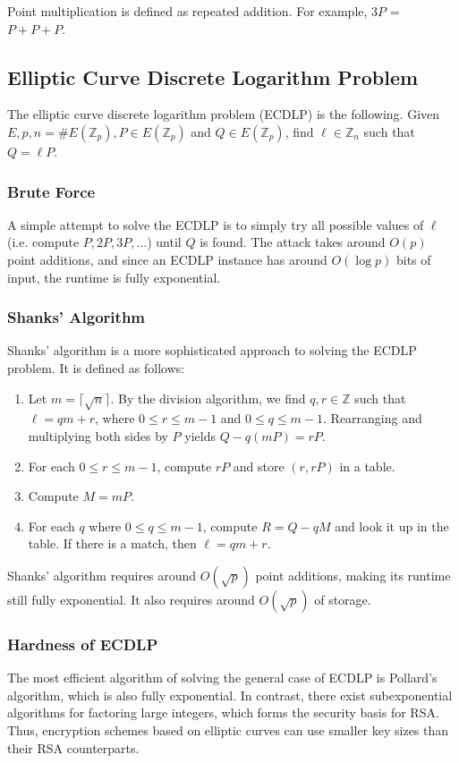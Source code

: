 \documentclass[12pt,titlepage]{article}
\begin{document}
        Point multiplication is defined as repeated addition. For example, $3 P$ = $P + P + P$.

    \subsection{Elliptic Curve Discrete Logarithm Problem}
      The elliptic curve discrete logarithm problem (ECDLP) is the following. Given $E, p, n = \#E(\mathbb{Z}_p), P \in E(\mathbb{Z}_p)$
      and $Q \in E(\mathbb{Z}_p)$, find $\ell \in \mathbb{Z}_n$ such that $Q = \ell P$.

      \subsubsection{Brute Force}
        A simple attempt to solve the ECDLP is to simply try all possible values of $\ell$ (i.e. compute $P, 2P, 3P, \dots$) until $Q$ is
        found. The attack takes around $O(p)$ point additions, and since an ECDLP instance has around $O(\log{p})$ bits of input, the runtime
        is fully exponential.

      \subsubsection{Shanks' Algorithm}
        Shanks' algorithm is a more sophisticated approach to solving the ECDLP problem. It is defined as follows:
        \begin{enumerate}
          \item Let $m = \lceil \sqrt{n} \rceil$. By the division algorithm, we find $q, r \in \mathbb{Z}$ such that $\ell = qm + r$, where
            $0 \leq r \leq m - 1$ and $0 \leq q \leq m - 1$. Rearranging and multiplying both sides by $P$ yields $Q - q(mP) = rP$.
          \item For each $0 \leq r \leq m - 1$, compute $rP$ and store $(r, rP)$ in a table.
          \item Compute $M = mP$.
          \item For each $q$ where $0 \leq q \leq m - 1$, compute $R = Q - qM$ and look it up in the table. If there is a match, then
            $\ell = qm + r$.
        \end{enumerate}

        Shanks' algorithm requires around $O(\sqrt{p})$ point additions, making its runtime still fully exponential. It also requires around
        $O(\sqrt{p})$ of storage.

      \subsubsection{Hardness of ECDLP}
        The most efficient algorithm of solving the general case of ECDLP is Pollard's algorithm, which is also fully exponential. In contrast,
        there exist subexponential algorithms for factoring large integers, which forms the security basis for RSA. Thus, encryption schemes based
        on elliptic curves can use smaller key sizes than their RSA counterparts.
\end{document}
